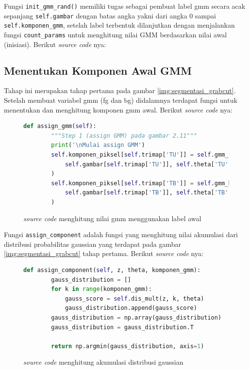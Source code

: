 Fungsi \texttt{init\_gmm\_rand()} memiliki tugas sebagai pembuat label gmm secara 
acak sepanjang  \texttt{self.gambar} dengan batas angka yakni dari angka 0 sampai 
\texttt{self.komponen\_gmm}, setelah label terbentuk dilanjutkan dengan menjalankan 
fungsi \texttt{count\_params} untuk menghitung nilai GMM berdasarkan nilai awal 
(inisiasi). Berikut \emph{source code} nya:

\subsection{Menentukan Komponen Awal GMM}
Tahap ini merupakan tahap pertama pada gambar \ref{img:segmentasi_grabcut}. Setelah
membuat variabel gmm (fg dan bg) didalamnya terdapat fungsi untuk menentukan dan 
menghitung komponen gmm awal. Berikut \emph{source code} nya:

\begin{figure}[H]
	\begin{lstlisting}[language=Python, basicstyle=\tiny]
	def assign_gmm(self):
        """Step 1 (assign GMM) pada gambar 2.11"""
        print('\nMulai assign GMM')
        self.komponen_piksel[self.trimap['TU']] = self.gmm_fg.assign_component(
            self.gambar[self.trimap['TU']], self.theta['TU'], self.komponen_gmm
        )
        self.komponen_piksel[self.trimap['TB']] = self.gmm_bg.assign_component(
            self.gambar[self.trimap['TB']], self.theta['TB'], self.komponen_gmm
        )
	\end{lstlisting}
	\caption{\emph{source code} menghitung nilai gmm menggunakan label awal}
	\label{code:assign_gmm}
\end{figure}

Fungsi \texttt{assign\_component} adalah fungsi yang menghitung nilai akumulasi 
dari distribusi probabilitas gaussian yang terdapat pada gambar \ref{img:segmentasi_grabcut}
tahap pertama. Berikut \emph{source code} nya:

\begin{figure}[H]
	\begin{lstlisting}[language=Python, basicstyle=\tiny]
	def assign_component(self, z, theta, komponen_gmm):
        gauss_distribution = []
        for k in range(komponen_gmm):
            gauss_score = self.dis_mult(z, k, theta)
            gauss_distribution.append(gauss_score)
        gauss_distribution = np.array(gauss_distribution)
        gauss_distribution = gauss_distribution.T

        return np.argmin(gauss_distribution, axis=1)
	\end{lstlisting}
	\caption{\emph{source code} menghitung akumulasi distribusi gaussian}
	\label{code:assign_component}
\end{figure}

